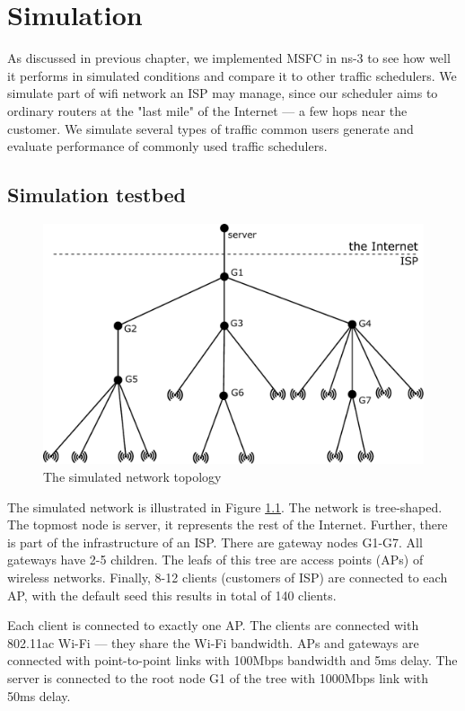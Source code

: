 \chapter{Simulation}
\label{chap3}
As discussed in previous chapter, we implemented MSFC in ns-3 to see how well it performs in simulated conditions and compare it to other traffic schedulers. We simulate part of wifi network an ISP may manage, since our scheduler aims to ordinary routers at the "last mile" of the Internet --- a few hops near the customer. We simulate several types of traffic common users generate and evaluate performance of commonly used traffic schedulers. 

\section{Simulation testbed}
\label{testbed}
\begin{figure}
	\centering
	\includegraphics[width=137mm]{drawings/layout}
	\caption{The simulated network topology}
	\label{fig11:sim_layout}
\end{figure}


The simulated network is illustrated in Figure \ref{fig11:sim_layout}. The network is tree-shaped. The topmost node is server, it represents the rest of the Internet. Further, there is part of the infrastructure of an ISP. There are gateway nodes G1-G7. All gateways have 2-5 children. The leafs of this tree are access points (APs) of wireless networks. Finally, 8-12 clients (customers of ISP) are connected to each AP, with the default seed this results in total of 140 clients. 

Each client is connected to exactly one AP. The clients are connected with 802.11ac Wi-Fi --- they share the Wi-Fi bandwidth. APs and gateways are connected with point-to-point links with 100Mbps bandwidth and 5ms delay. The server is connected to the root node G1 of the tree with 1000Mbps link with 50ms delay.

